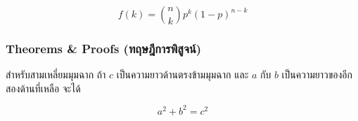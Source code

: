 \documentclass[
]{article}
\begin{document}
\begin{equation}
  f\left(k\right) = \binom{n}{k} p^k\left(1-p\right)^{n-k}
\end{equation}

\hypertarget{theorems-proofs-uxe17uxe24uxe29uxe0euxe01uxe32uxe23uxe1euxe2auxe08uxe19}{%
\subsubsection{Theorems \& Proofs
(ทฤษฎีการพิสูจน์)}\label{theorems-proofs-uxe17uxe24uxe29uxe0euxe01uxe32uxe23uxe1euxe2auxe08uxe19}}

\leavevmode{}%
สำหรับสามเหลี่ยมมุมฉาก ถ้า \(c\) เป็นความยาวด้านตรงข้ามมุมฉาก และ \(a\)
กับ \(b\) เป็นความยาวของอีกสองด้านที่เหลือ จะได้

\[a^2 + b^2 = c^2\]
\end{document}
